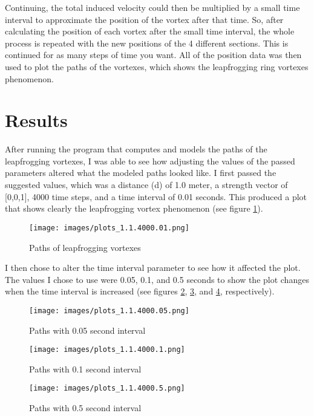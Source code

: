 \documentclass{article}
\begin{document}
Continuing, the total induced velocity could then be multiplied by a small time interval to approximate the position of the vortex after that time. So, after calculating the position of each vortex after the small time interval, the whole process is repeated with the new positions of the 4 different sections. This is continued for as many steps of time you want. All of the position data was then used to plot the paths of the vortexes, which shows the leapfrogging ring vortexes phenomenon.

\section{Results}
After running the program that computes and models the paths of the leapfrogging vortexes, I was able to see how adjusting the values of the passed parameters altered what the modeled paths looked like. I first passed the suggested values, which was a distance (d) of 1.0 meter, a strength vector of [0,0,1], 4000 time steps, and a time interval of 0.01 seconds. This produced a plot that shows clearly the leapfrogging vortex phenomenon (see figure \ref{fig:paths_01_time}).

\begin{figure}[ht]
\centering
\texttt{[image: images/plots\_1.1.4000.01.png]}
\caption{Paths of leapfrogging vortexes}
\label{fig:paths_01_time}
\end{figure}

I then chose to alter the time interval parameter to see how it affected the plot. The values I chose to use were 0.05, 0.1, and 0.5 seconds to show the plot changes when the time interval is increased (see figures \ref{fig:paths_05_time}, \ref{fig:paths_1_time}, and \ref{fig:paths_5_time}, respectively).

\begin{figure}[ht]
\centering
\texttt{[image: images/plots\_1.1.4000.05.png]}
\caption{Paths with 0.05 second interval}
\label{fig:paths_05_time}
\end{figure}

\begin{figure}[ht]
\centering
\texttt{[image: images/plots\_1.1.4000.1.png]}
\caption{Paths with 0.1 second interval}
\label{fig:paths_1_time}
\end{figure}

\begin{figure}[ht]
\centering
\texttt{[image: images/plots\_1.1.4000.5.png]}
\caption{Paths with 0.5 second interval}
\label{fig:paths_5_time}
\end{figure}
\end{document}
